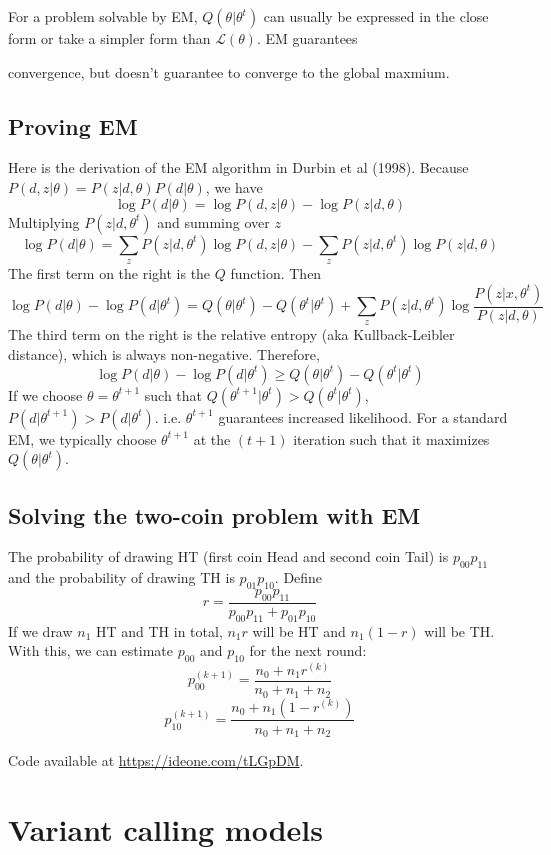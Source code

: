 \documentclass[10pt]{article}
\begin{document}
For a problem solvable by EM, $Q(\theta|\theta^t)$ can usually be expressed in
the close form or take a simpler form than $\mathcal{L}(\theta)$. EM guarantees

convergence, but doesn't guarantee to converge to the global maxmium.

\subsection{Proving EM}

Here is the derivation of the EM algorithm in Durbin et al (1998). Because
$P(d,z|\theta)=P(z|d,\theta)P(d|\theta)$, we have
$$
\log P(d|\theta)=\log P(d,z|\theta)-\log P(z|d,\theta)
$$
Multiplying $P(z|d,\theta^t)$ and summing over $z$
$$
\log P(d|\theta)=\sum_zP(z|d,\theta^t)\log P(d,z|\theta) - \sum_zP(z|d,\theta^t)\log P(z|d,\theta)
$$
The first term on the right is the $Q$ function. Then
$$
\log P(d|\theta)-\log P(d|\theta^t)=Q(\theta|\theta^t)-Q(\theta^t|\theta^t)+\sum_z P(z|d,\theta^t)\log\frac{P(z|x,\theta^t)}{P(z|d,\theta)}
$$
The third term on the right is the relative entropy (aka Kullback-Leibler
distance), which is always non-negative. Therefore,
$$
\log P(d|\theta)-\log P(d|\theta^t)\ge Q(\theta|\theta^t)-Q(\theta^t|\theta^t)
$$
If we choose $\theta=\theta^{t+1}$ such that
$Q(\theta^{t+1}|\theta^t)>Q(\theta^t|\theta^t)$,
$P(d|\theta^{t+1})>P(d|\theta^t)$. i.e. $\theta^{t+1}$ guarantees increased
likelihood. For a standard EM, we typically choose $\theta^{t+1}$ at the $(t+1)$
iteration such that it maximizes $Q(\theta|\theta^t)$.

\subsection{Solving the two-coin problem with EM}

The probability of drawing HT (first coin Head and second coin Tail) is
$p_{00}p_{11}$ and the probability of drawing TH is $p_{01}p_{10}$. Define
$$
r=\frac{p_{00}p_{11}}{p_{00}p_{11}+p_{01}p_{10}}
$$
If we draw $n_1$ HT and TH in total, $n_1r$ will be HT and $n_1(1-r)$ will be
TH. With this, we can estimate $p_{00}$ and $p_{10}$ for the next round:
$$
p^{(k+1)}_{00}=\frac{n_0+n_1r^{(k)}}{n_0+n_1+n_2}
$$
$$
p^{(k+1)}_{10}=\frac{n_0+n_1(1-r^{(k)})}{n_0+n_1+n_2}
$$

Code available at \href{https://ideone.com/tLGpDM}{https://ideone.com/tLGpDM}.

\newpage

\section{Variant calling models}
\end{document}

